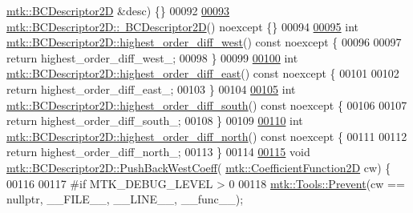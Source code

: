 \begin{DoxyCode}
      \hyperlink{classmtk_1_1BCDescriptor2D}{mtk::BCDescriptor2D} &desc) \{\}
00092 
\hypertarget{mtk__bc__descriptor__2d_8cc_source_l00093}{}\hyperlink{classmtk_1_1BCDescriptor2D_ae14e62548a8bc080d576fff6937c546b}{00093} \hyperlink{classmtk_1_1BCDescriptor2D_ae14e62548a8bc080d576fff6937c546b}{mtk::BCDescriptor2D::~BCDescriptor2D}() noexcept \{\}
00094 
\hypertarget{mtk__bc__descriptor__2d_8cc_source_l00095}{}\hyperlink{classmtk_1_1BCDescriptor2D_a0fa469ddf6ff76e2858d6d3b76cc8b6f}{00095} \textcolor{keywordtype}{int} \hyperlink{classmtk_1_1BCDescriptor2D_a0fa469ddf6ff76e2858d6d3b76cc8b6f}{mtk::BCDescriptor2D::highest\_order\_diff\_west}() const 
      noexcept \{
00096 
00097   \textcolor{keywordflow}{return} highest\_order\_diff\_west\_;
00098 \}
00099 
\hypertarget{mtk__bc__descriptor__2d_8cc_source_l00100}{}\hyperlink{classmtk_1_1BCDescriptor2D_a5a9b80a2e9e579b05d9f3589d80448b6}{00100} \textcolor{keywordtype}{int} \hyperlink{classmtk_1_1BCDescriptor2D_a5a9b80a2e9e579b05d9f3589d80448b6}{mtk::BCDescriptor2D::highest\_order\_diff\_east}() const 
      noexcept \{
00101 
00102   \textcolor{keywordflow}{return} highest\_order\_diff\_east\_;
00103 \}
00104 
\hypertarget{mtk__bc__descriptor__2d_8cc_source_l00105}{}\hyperlink{classmtk_1_1BCDescriptor2D_a463d909f6014e7f01b33171a06d7b400}{00105} \textcolor{keywordtype}{int} \hyperlink{classmtk_1_1BCDescriptor2D_a463d909f6014e7f01b33171a06d7b400}{mtk::BCDescriptor2D::highest\_order\_diff\_south}() const 
      noexcept \{
00106 
00107   \textcolor{keywordflow}{return} highest\_order\_diff\_south\_;
00108 \}
00109 
\hypertarget{mtk__bc__descriptor__2d_8cc_source_l00110}{}\hyperlink{classmtk_1_1BCDescriptor2D_a87c5f2449247d65ea07784ba2ec61bc7}{00110} \textcolor{keywordtype}{int} \hyperlink{classmtk_1_1BCDescriptor2D_a87c5f2449247d65ea07784ba2ec61bc7}{mtk::BCDescriptor2D::highest\_order\_diff\_north}() const 
      noexcept \{
00111 
00112   \textcolor{keywordflow}{return} highest\_order\_diff\_north\_;
00113 \}
00114 
\hypertarget{mtk__bc__descriptor__2d_8cc_source_l00115}{}\hyperlink{classmtk_1_1BCDescriptor2D_a3da32ba89cfb15032bb1156394bad98c}{00115} \textcolor{keywordtype}{void} \hyperlink{classmtk_1_1BCDescriptor2D_a3da32ba89cfb15032bb1156394bad98c}{mtk::BCDescriptor2D::PushBackWestCoeff}(
      \hyperlink{group__c07-mim__ops_gad9e1c0ace886b0029aefffa5f320e852}{mtk::CoefficientFunction2D} cw) \{
00116 
00117 \textcolor{preprocessor}{  #if MTK\_DEBUG\_LEVEL > 0}
00118   \hyperlink{classmtk_1_1Tools_a332324c6f25e66be9dff48c5987a3b9f}{mtk::Tools::Prevent}(cw == \textcolor{keyword}{nullptr}, \_\_FILE\_\_, \_\_LINE\_\_, \_\_func\_\_);

\end{DoxyCode}
